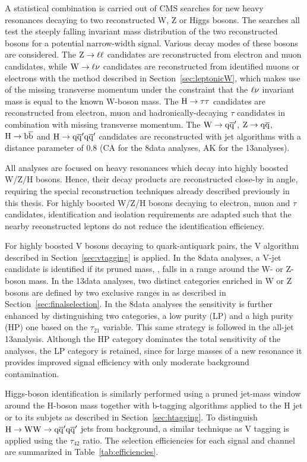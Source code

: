 A statistical combination is carried out of CMS searches for new heavy resonances decaying to two reconstructed W, Z or Higgs bosons.
The searches all test the steeply falling invariant mass distribution of the two reconstructed bosons for a potential narrow-width signal.
Various decay modes of these bosons are considered.
The $\mathrm{Z}\to\ell\ell$ candidates are reconstructed from electron and muon candidates, while $\mathrm{W}\to\ell\nu$ candidates are reconstructed from identified muons or electrons with the method described in Section~\ref{sec:leptonicW}, which makes use of the missing transverse momentum under the constraint that the $\ell\nu$ invariant mass is equal to the known W-boson mass.
The $\mathrm{H}\to\tau\tau$ candidates are reconstructed from electron, muon and hadronically-decaying $\tau$ candidates in combination with missing transverse momentum.
The $\mathrm{W}\to\mathrm{q}\overline{\mathrm{q}}'$, $\mathrm{Z}\to\mathrm{q}\overline{\mathrm{q}}$, $\mathrm{H}\to{\mathrm{b}\overline{\mathrm{b}}}$ and $\mathrm{H}\to\mathrm{q}\overline{\mathrm{q}}'\mathrm{q}\overline{\mathrm{q}}'$ candidates are reconstructed with jet algorithms with a distance parameter of 0.8 (CA for the 8\TeV data analyses, AK for the 13\TeV analyses). 

All analyses are focused on heavy resonances which decay into highly boosted W/Z/H bosons. Hence, their decay products are reconstructed close-by in angle, requiring the special reconstruction techniques already described previously in this thesis. For highly boosted W/Z/H bosons decaying to electron, muon and $\tau$ candidates, identification and isolation requirements are adapted such that the nearby reconstructed leptons do not reduce the identification efficiency.

For highly boosted V bosons decaying to quark-antiquark pairs, the V algorithm described in Section~\ref{sec:vtagging} is applied.
In the 8\TeV data analyses, a V-jet candidate is identified if its pruned mass, \mJ, falls in a range around the W- or Z-boson mass.
In the 13\TeV data analyses, two distinct categories enriched in W or Z bosons are defined by two exclusive ranges in \mJ as described in Section~\ref{sec:finalselection}.
In the 8\TeV data analyses the sensitivity is further enhanced by distinguishing two categories, a low purity (LP) and a high purity (HP) one based on the $\tau_{21}$ variable.
This same strategy is followed in the all-jet 13\TeV analysis. Although the HP category dominates the total sensitivity of the analyses, the LP category is retained,
since for large masses of a new resonance it provides improved signal efficiency with only moderate background contamination.

Higgs-boson identification is similarly performed using a pruned jet-mass window around the H-boson mass together with b-tagging algorithms applied to the H jet or to its subjets as described in Section~\ref{sec:htagging}.
To distinguish $\mathrm{H}\to\mathrm{W}\mathrm{W}\to\mathrm{q}\overline{\mathrm{q}}'\mathrm{q}\overline{\mathrm{q}}'$ jets from background, a similar technique as V tagging is applied using the $\tau_{42}$ ratio. The selection efficiencies for each signal and channel are summarized in Table~\ref{tab:efficiencies}.

